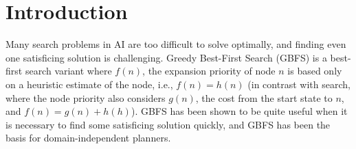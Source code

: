 


\section{Introduction}

Many search problems in AI are too difficult to solve optimally, and finding even one satisficing solution is challenging. 
Greedy Best-First Search (GBFS) is a best-first search variant where $f(n)$, the expansion priority of node $n$ is based only on a heuristic estimate of the node, i.e., $f(n) = h(n)$  (in contrast with \astar search, where the node priority also considers $g(n)$, the cost from the start state to $n$, and $f(n) = g(n)+h(h)$).
GBFS has been shown to be quite useful when it is necessary to find some  satisficing solution quickly, and GBFS 
has been the basis for \lsota domain-independent planners. %

